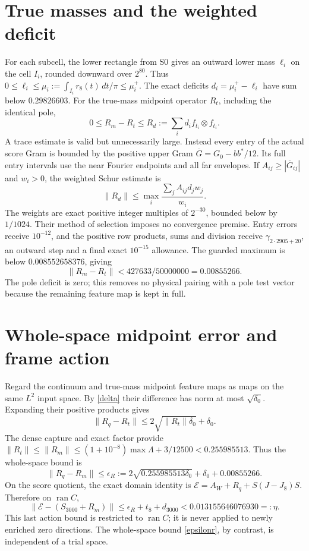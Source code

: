 \documentclass[11pt]{article}
\newcommand{\Ran}{\operatorname{ran}}
\newcommand{\dd}{\,d}
\numberwithin{equation}{section}
\begin{document}
\section{True masses and the weighted deficit}\label{mass}
For each subcell, the lower rectangle from S0 gives an outward
lower mass $\ell_i$ on the cell $I_i$, rounded downward over $2^{80}$.
Thus $0\le\ell_i\le\mu_i:=\int_{I_i}r_8(t)\dd t/\pi\le\mu_i^+$.
The exact deficits $d_i=\mu_i^+-\ell_i$ have sum below $0.29826603$.
For the true-mass midpoint operator $R_t$, including the identical pole,
\[
 0\le R_m-R_t\le R_d:=\sum_i d_i f_{t_i}\otimes f_{t_i}.
\]
A trace estimate is valid but unnecessarily large. Instead every
entry of the actual score Gram is bounded by the positive upper Gram
$\overline G=G_0-bb^*/12$. Its full entry intervals use the near
Fourier endpoints and all far envelopes. If $A_{ij}\ge|\overline G_{ij}|$
and $w_i>0$, the weighted Schur estimate is
\[
 \|R_d\|\le\max_i\frac{\sum_j A_{ij}d_jw_j}{w_i}.
\]
The weights are exact positive integer multiples of $2^{-30}$, bounded
below by $1/1024$. Their method of selection imposes no convergence
premise. Entry errors receive $10^{-12}$, and the positive row products,
sums and division receive $\gamma_{2\cdot2905+20}$, an outward step
and a final exact $10^{-15}$ allowance. The guarded maximum is below
$0.008552658376$, giving
\begin{equation}\label{deficit}
 \|R_m-R_t\|<427633/50000000=0.00855266.
\end{equation}
The pole deficit is zero; this removes no physical pairing with a pole
test vector because the remaining feature map is kept in full.

\section{Whole-space midpoint error and frame action}\label{bridge}
Regard the continuum and true-mass midpoint feature maps as maps
on the same $L^2$ input space. By \eqref{delta} their difference has
norm at most $\sqrt{\delta_0}$. Expanding their positive products gives
\[
 \|R_q-R_t\|\le2\sqrt{\|R_t\|\delta_0}+\delta_0.
\]
The dense capture and exact factor provide
$\|R_t\|\le\|R_m\|\le(1+10^{-8})\max\Lambda+3/12500
<0.255985513$. Thus the whole-space bound is
\begin{equation}\label{epsilonr}
 \|R_q-R_m\|\le\epsilon_R:=
 2\sqrt{0.255985513\delta_0}+\delta_0+0.00855266.
\end{equation}
On the score quotient, the exact domain identity is
$\mathcal E=A_W+R_q+S(J-J_8)S$. Therefore on $\Ran C$,
\[
 \|\mathcal E-(S_{3000}+R_m)\|\le\epsilon_R+t_8+d_{3000}
 <0.013155646076930=:\eta.
\]
This last action bound is restricted to $\Ran C$; it is never applied
to newly enriched zero directions. The whole-space bound
\eqref{epsilonr}, by contrast, is independent of a trial space.
\end{document}
